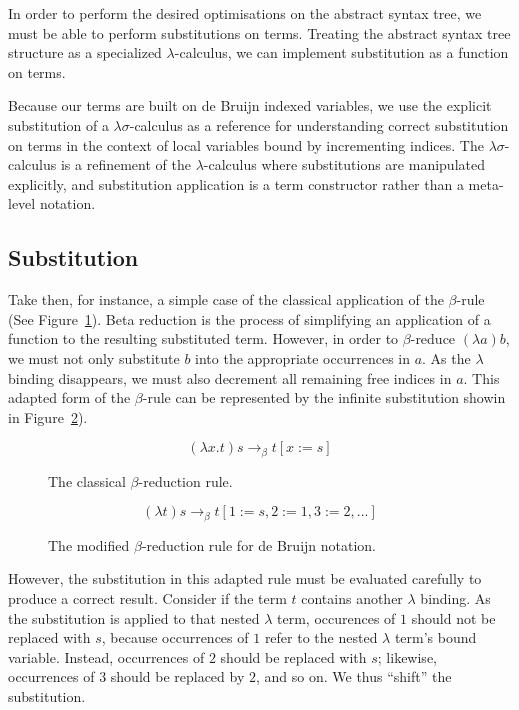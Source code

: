 In order to perform the desired optimisations on the abstract syntax tree, we must be able to perform substitutions on terms. Treating the abstract syntax tree structure as a specialized $\lambda$-calculus, we can implement substitution as a function on terms.

Because our terms are built on de Bruijn indexed variables, we use the explicit substitution of a $\lambda\sigma$-calculus as a reference for understanding correct substitution on terms in the context of local variables bound by incrementing indices. The $\lambda\sigma$-calculus is a refinement of the $\lambda$-calculus where substitutions are manipulated explicitly, and substitution application is a term constructor rather than a meta-level notation.\cite{abadi1991}

\subsection{Substitution}

Take then, for instance, a simple case of the classical application of the $\beta$-rule (See Figure~\ref{eq:beta_rule}). Beta reduction is the process of simplifying an application of a function to the resulting substituted term. However, in order to $\beta$-reduce $(\lambda a)b$, we must not only substitute $b$ into the appropriate occurrences in $a$. As the $\lambda$ binding disappears, we must also decrement all remaining free indices in $a$. This adapted form of the $\beta$-rule can be represented by the infinite substitution showin in Figure~\ref{eq:beta_rule2}).\cite{abadi1991}

\begin{figure}[h]
\begin{equation*}
(\lambda x.t)s \to_{\beta} t[x := s]
\end{equation*}
\caption{The classical $\beta$-reduction rule.}
\label{eq:beta_rule}
\end{figure}

\begin{figure}[h]
\begin{equation*}
(\lambda t)s \to_{\beta} t[1 := s, 2 := 1, 3 := 2, ...]
\end{equation*}
\caption{The modified $\beta$-reduction rule for de Bruijn notation.}
\label{eq:beta_rule2}
\end{figure}

However, the substitution in this adapted rule must be evaluated carefully to produce a correct result. Consider if the term $t$ contains another $\lambda$ binding. As the substitution is applied to that nested $\lambda$ term, occurences of $1$ should not be replaced with $s$, because occurrences of $1$ refer to the nested $\lambda$ term's bound variable. Instead, occurrences of $2$ should be replaced with $s$; likewise, occurrences of $3$ should be replaced by $2$, and so on. We thus ``shift'' the substitution.\cite{abadi1991}

